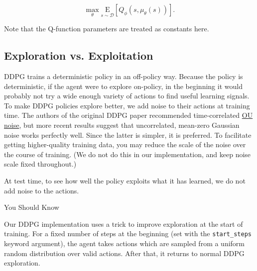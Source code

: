 \[\max_{\theta} \underset{s \sim {\mathcal D}}{{\mathrm E}}\left[ Q_{\phi}(s, \mu_{\theta}(s)) \right].\]

Note that the Q-function parameters are treated as constants here.

\hypertarget{exploration-vs.-exploitation}{%
\subsection{Exploration vs.
Exploitation}\label{exploration-vs.-exploitation}}

DDPG trains a deterministic policy in an off-policy way. Because the
policy is deterministic, if the agent were to explore on-policy, in the
beginning it would probably not try a wide enough variety of actions to
find useful learning signals. To make DDPG policies explore better, we
add noise to their actions at training time. The authors of the original
DDPG paper recommended time-correlated
\href{https://en.wikipedia.org/wiki/Ornstein\%E2\%80\%93Uhlenbeck_process}{OU
noise}, but more recent results suggest that uncorrelated, mean-zero
Gaussian noise works perfectly well. Since the latter is simpler, it is
preferred. To facilitate getting higher-quality training data, you may
reduce the scale of the noise over the course of training. (We do not do
this in our implementation, and keep noise scale fixed throughout.)

At test time, to see how well the policy exploits what it has learned,
we do not add noise to the actions.

You Should Know

Our DDPG implementation uses a trick to improve exploration at the start
of training. For a fixed number of steps at the beginning (set with the
\texttt{start\_steps} keyword argument), the agent takes actions which
are sampled from a uniform random distribution over valid actions. After
that, it returns to normal DDPG exploration.

